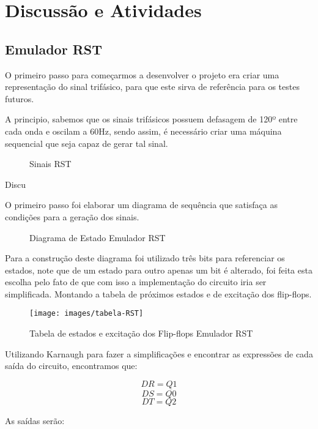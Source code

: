 \chapter{Discussão e Atividades}

\section{Emulador RST}

O primeiro passo para começarmos a desenvolver o projeto era criar uma representação do sinal trifásico, para que este sirva de referência para os testes futuros.

A principio, sabemos que os sinais trifásicos possuem defasagem de 120º entre cada onda e oscilam a 60Hz, sendo assim, é necessário criar uma máquina sequencial que seja capaz de gerar tal sinal.

\begin{figure}[!htp]
	\centering
	\caption{Sinais RST}
	\label{fig:sinais-rst}
\end{figure}Discu\2

O primeiro passo foi elaborar um diagrama de sequência que satisfaça as condições para a geração dos sinais.

\begin{figure}[!htp]
	\centering
	\caption{Diagrama de Estado Emulador RST}
	\label{fig:disgrama-de-estado-EmuladorRST}
\end{figure}

Para a construção deste diagrama foi utilizado três bits para referenciar os estados, note que de um estado para outro apenas um bit é alterado, foi feita esta escolha pelo fato de que com isso a implementação do circuito iria ser simplificada. Montando a tabela de próximos estados e de excitação dos flip-flops.

\begin{figure}[!htp]
	\centering
	\caption{Tabela de estados e excitação dos Flip-flops Emulador RST}
	\texttt{[image: images/tabela-RST]}
	\label{fig:tabela-RST}
\end{figure}

Utilizando Karnaugh para fazer a simplificações e encontrar as expressões de cada saída do circuito, encontramos que:

$$DR = Q1$$
$$DS = \overline{Q0}$$
$$DT = Q2$$

As saídas serão:

